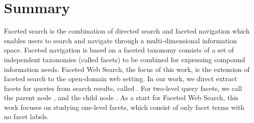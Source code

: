 

\section{Summary}
Faceted search is the combination of directed search and faceted navigation which enables users to search and navigate through a multi-dimensional information space. Faceted navigation is based on a faceted taxonomy consists of a set of independent taxonomies (called facets) to be combined for expressing compound information needs. Faceted Web Search, the focus of this work, is the extension of faceted search to the open-domain web setting. In our work, we direct extract facets for queries from search results, called . For two-level query facets, we call the parent node , and the child node . As a start for Faceted Web Search, this work focuses on studying one-level facets, which consist of only facet terms with no facet labels.


